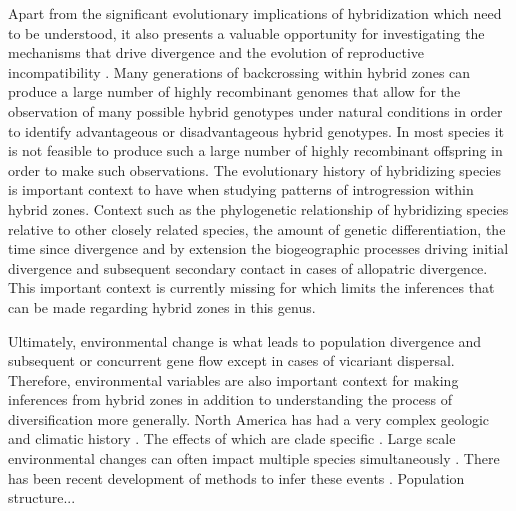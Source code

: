 Apart from the significant evolutionary implications of hybridization which 
need to be understood, it also presents a valuable opportunity for investigating 
the mechanisms that drive divergence and the evolution of reproductive
incompatibility \parencite{rieseberg1999}. 
Many generations of backcrossing within hybrid zones can produce a large number
of highly recombinant genomes that allow for the observation of many possible 
hybrid genotypes under natural conditions in order to identify advantageous or
disadvantageous hybrid genotypes. 
In most species it is not feasible to produce such a large number of highly  
recombinant offspring in order to make such observations.
The evolutionary history of hybridizing species is important context to have 
when studying patterns of introgression within hybrid zones. 
Context such as the phylogenetic relationship of hybridizing species relative to
other closely related species, the amount of genetic differentiation, 
the time since divergence and by extension the biogeographic 
processes driving initial divergence and subsequent secondary contact in cases 
of allopatric divergence.
This important context is currently missing for \anaxyrus which limits the
inferences that can be made regarding hybrid zones in this genus. 


Ultimately, environmental change is what leads to population divergence and subsequent 
or concurrent gene flow except in cases of vicariant dispersal.
Therefore, environmental variables are also important context for making 
inferences from hybrid zones in addition to understanding the process of 
diversification more generally.
North America has had a very complex geologic and climatic history \parencite{lyman2022}.
The effects of which are clade specific \parencite{nunez2023}.
Large scale environmental changes can often impact multiple species simultaneously \parencite{oaks2019}.
There has been recent development of methods to infer these events \parencite{oaks2019,oaks2022}.
Population structure...


